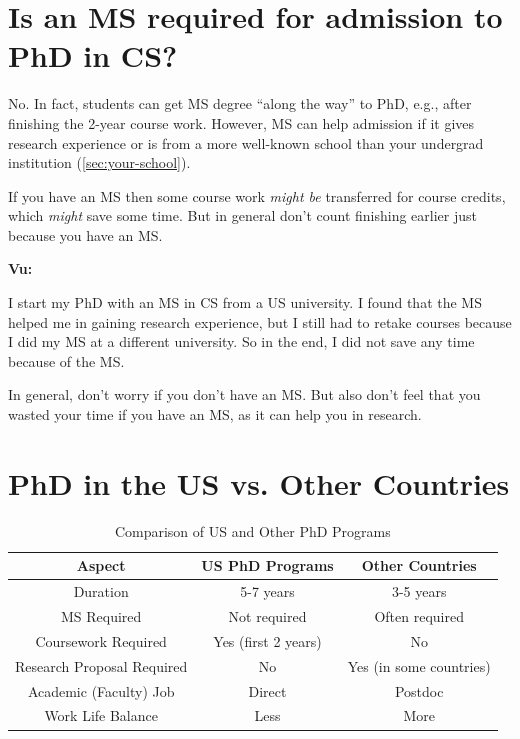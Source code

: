 \documentclass[oneside,11pt,dvipsnames]{book}
\newenvironment{commentbox}[1][]{
  \small
  \begin{mybox}
    {\small \textbf{#1}}
  }{
  \end{mybox}
}
\def\sectioninfo#1{%
  \addcontentsline{toc}{sectioninfo}{%
    \noexpand\numberline{}\color{black}{#1}}%
}
\begin{document}
\section{Is an MS required for admission to PhD in CS?}\label{sec:msrequirement}
\sectioninfo{You do not need an MS to do PhD in CS.}

No. In fact, students can get MS degree ``along the way'' to PhD, e.g., after finishing the 2-year course work.  However, MS can help admission if it gives research experience or is from a more well-known school than your undergrad institution (\autoref{sec:your-school}).

If you have an MS then some course work \emph{might be} transferred for course credits, which \emph{might} save some time. But in general don't count finishing earlier just because you have an MS. 

\begin{commentbox}[Vu:]
    I start my PhD with an MS in CS from a US university.  I found that the MS helped me in gaining research experience, but I still had to retake courses because I did my MS at a different university.  So in the end, I did not save any time because of the MS.
    
    In general, don't worry if you don't have an MS. But also don't feel that you wasted your time if you have an MS, as it can help you in research.
  \end{commentbox}



\section{PhD in the US vs. Other Countries}\label{sec:non-us-differences}
\sectioninfo{Among several differences, CS PhD in the US does not require an MS degree but has a longer PhD study time.}

\begin{table}
\caption{Comparison of US and Other PhD Programs}\label{tab:us-vs-other}
\begin{tabular}{c|c|c}
\toprule
\textbf{Aspect} & \textbf{US PhD Programs} & \textbf{Other Countries} \\
\midrule
Duration & 5-7 years & 3-5 years \\
MS Required & Not required & Often required \\
Coursework Required & Yes (first 2 years) & No \\
Research Proposal Required & No & Yes (in some countries) \\
Academic (Faculty) Job & Direct & Postdoc \\
Work Life Balance & Less & More \\
\bottomrule
\end{tabular}
\end{table}
\end{document}
